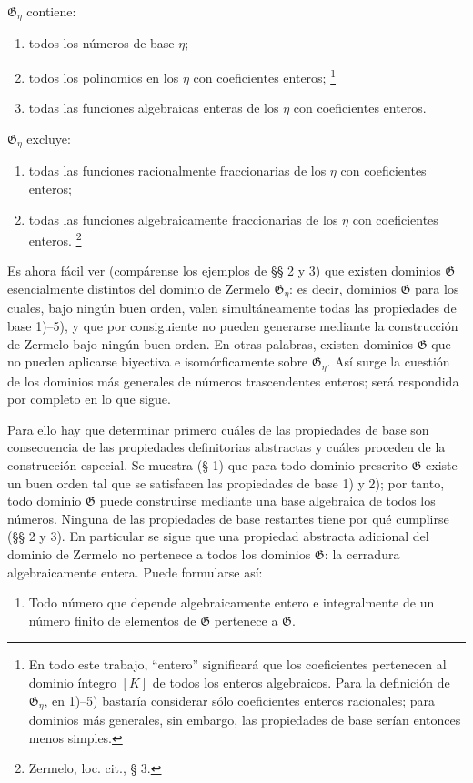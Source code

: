 $\mathfrak G_\eta$ contiene:
\begin{enumerate}
\item[1)] todos los números de base $\eta$;
\item[2)] todos los polinomios en los $\eta$ con coeficientes enteros;
\footnote{En todo este trabajo, ``entero'' significará que los coeficientes pertenecen al dominio íntegro $[K]$ de todos los enteros algebraicos. Para la definición de $\mathfrak G_\eta$, en 1)--5) bastaría considerar sólo coeficientes enteros racionales; para dominios más generales, sin embargo, las propiedades de base serían entonces menos simples.}
\item[3)] todas las funciones algebraicas enteras de los $\eta$ con coeficientes enteros.
\end{enumerate}
$\mathfrak G_\eta$ excluye:
\begin{enumerate}
\item[4)] todas las funciones racionalmente fraccionarias de los $\eta$ con coeficientes enteros;
\item[5)] todas las funciones algebraicamente fraccionarias de los $\eta$ con coeficientes enteros.
\footnote{Zermelo, loc. cit., § 3.}
\end{enumerate}

Es ahora fácil ver (compárense los ejemplos de §§ 2 y 3) que existen dominios $\mathfrak G$ esencialmente distintos del dominio de Zermelo $\mathfrak G_\eta$: es decir, dominios $\mathfrak G$ para los cuales, bajo ningún buen orden, valen simultáneamente todas las propiedades de base 1)--5), y que por consiguiente no pueden generarse mediante la construcción de Zermelo bajo ningún buen orden. En otras palabras, existen dominios $\mathfrak G$ que no pueden aplicarse biyectiva e isomórficamente sobre $\mathfrak G_\eta$. Así surge la cuestión de los dominios más generales de números trascendentes enteros; será respondida por completo en lo que sigue.

Para ello hay que determinar primero cuáles de las propiedades de base son consecuencia de las propiedades definitorias abstractas y cuáles proceden de la construcción especial. Se muestra (§ 1) que para todo dominio prescrito $\mathfrak G$ existe un buen orden tal que se satisfacen las propiedades de base 1) y 2); por tanto, todo dominio $\mathfrak G$ puede construirse mediante una base algebraica de todos los números. Ninguna de las propiedades de base restantes tiene por qué cumplirse (§§ 2 y 3). En particular se sigue que una propiedad abstracta adicional del dominio de Zermelo no pertenece a todos los dominios $\mathfrak G$: la cerradura algebraicamente entera. Puede formularse así:
\begin{enumerate}
\item[V.] Todo número que depende algebraicamente entero e integralmente de un número finito de elementos de $\mathfrak G$ pertenece a $\mathfrak G$.
\end{enumerate}

